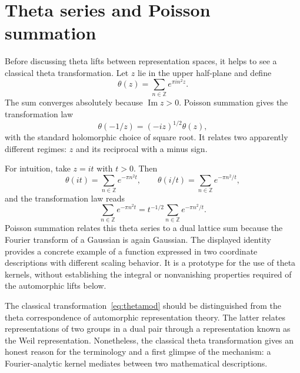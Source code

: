 \documentclass[11pt,openany,oneside]{scrbook}
\theoremstyle{definition}
\theoremstyle{remark}
\newcommand{\ZZ}{\mathbb Z}
\begin{document}
\section{Theta series and Poisson summation}
Before discussing theta lifts between representation spaces, it helps to see a classical theta transformation. Let $z$ lie in the upper half-plane and define
\begin{equation}\label{eq:theta}
\theta(z)=\sum_{n\in\ZZ}e^{\pi i n^2z}.
\end{equation}
The sum converges absolutely because $\operatorname{Im}z>0$. Poisson summation gives the transformation law
\begin{equation}\label{eq:thetamod}
\theta(-1/z)=(-iz)^{1/2}\theta(z),
\end{equation}
with the standard holomorphic choice of square root. It relates two apparently different regimes: $z$ and its reciprocal with a minus sign.

For intuition, take $z=it$ with $t>0$. Then
\[
\theta(it)=\sum_{n\in\ZZ}e^{-\pi n^2t},
\qquad
\theta(i/t)=\sum_{n\in\ZZ}e^{-\pi n^2/t},
\]
and the transformation law reads
\begin{equation}\label{eq:poisson}
\sum_{n\in\ZZ}e^{-\pi n^2t}
=t^{-1/2}\sum_{n\in\ZZ}e^{-\pi n^2/t}.
\end{equation}
Poisson summation relates this theta series to a dual lattice sum because the Fourier transform of a Gaussian is again Gaussian. The displayed identity provides a concrete example of a function expressed in two coordinate descriptions with different scaling behavior. It is a prototype for the use of theta kernels, without establishing the integral or nonvanishing properties required of the automorphic lifts below.

The classical transformation~\eqref{eq:thetamod} should be distinguished from the theta correspondence of automorphic representation theory. The latter relates representations of two groups in a dual pair through a representation known as the Weil representation. Nonetheless, the classical theta transformation gives an honest reason for the terminology and a first glimpse of the mechanism: a Fourier-analytic kernel mediates between two mathematical descriptions.
\end{document}
